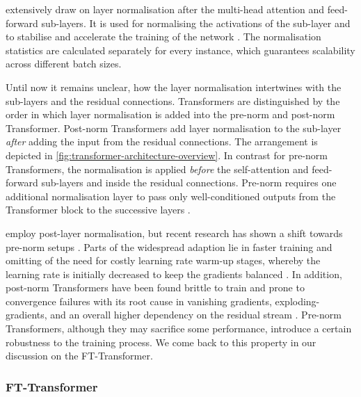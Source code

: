 \textcite[][3]{vaswaniAttentionAllYou2017} extensively draw on layer normalisation \autocite[][4]{baLayerNormalization2016} after the multi-head attention and feed-forward sub-layers. It is used for normalising the activations of the sub-layer and to stabilise and accelerate the training of the network \autocite[][2]{baLayerNormalization2016}. The normalisation statistics are calculated separately for every instance, which guarantees scalability across different batch sizes.

Until now it remains unclear, how the layer normalisation intertwines with the sub-layers and the residual connections. Transformers are distinguished by the order in which layer normalisation is added into the pre-norm and post-norm Transformer. Post-norm Transformers add layer normalisation to the sub-layer \emph{after} adding the input from the residual connections. The arrangement is depicted in \cref{fig:transformer-architecture-overview}. In contrast for pre-norm Transformers, the normalisation is applied \emph{before} the self-attention and feed-forward sub-layers and inside the residual connections. Pre-norm requires one additional normalisation layer to pass only well-conditioned outputs from the Transformer block to the successive layers \autocite[][5]{xiongLayerNormalizationTransformer2020}.

\textcite[][3]{vaswaniAttentionAllYou2017} employ post-layer normalisation, but recent research has shown a shift towards pre-norm setups \autocite[][4]{narangTransformerModificationsTransfer2021}. Parts of the widespread adaption lie in faster training and omitting of the need for costly learning rate warm-up stages, whereby the learning rate is initially decreased to keep the gradients balanced \autocites[][2]{xiongLayerNormalizationTransformer2020}[][8]{liuUnderstandingDifficultyTraining2020}. In addition, post-norm Transformers have been found brittle to train and prone to convergence failures with its root cause in vanishing gradients, \glspl{exploding-gradient}, and an overall higher dependency on the residual stream \autocites[][8]{liuUnderstandingDifficultyTraining2020}[][1812]{wangLearningDeepTransformer2019}. Pre-norm Transformers, although they may sacrifice some performance, introduce a certain robustness to the training process. We come back to this property in our discussion on the FT-Transformer.

\subsubsection{FT-Transformer}\label{sec:fttransformer}

